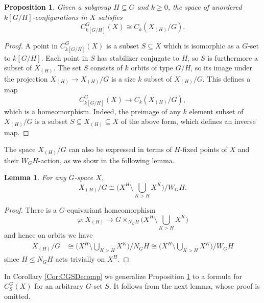 \documentclass[11pt]{amsart}
\newtheorem{lemma}[equation]{Lemma}
\newtheorem{proposition}[equation]{Proposition}
\theoremstyle{definition}
\numberwithin{equation}{subsection} %
\begin{document}
\begin{proposition}\label{Prop:CGOrbits}
Given a subgroup $H\subseteq G$ and $k\geq 0$,
the space of unordered $k[G/H]$-configurations in $X$ satisfies 
$$ C^G_{k[G/H]}(X) \cong C_k \left( X_{(H)}/G \right). $$
\end{proposition}
\begin{proof}
A point in $C^G_{k[G/H]}(X)$ is a subset $S\subseteq X$ which is isomorphic as a $G$-set to $k[G/H]$. Each point in $S$ has stabilizer conjugate to $H$, so $S$ is furthermore a subset of $X_{(H)}$. The set $S$ consists of $k$ orbits of type $G/H$, so its image under the projection $X_{(H)}\to X_{(H)}/G$ is a size $k$ subset of $X_{(H)}/G$. This defines a map $$ C^G_{k[G/H]}(X) \to C_k \left( X_{(H)}/G \right), $$
which is a homeomorphism. Indeed, the preimage of any $k$ element subset of $X_{(H)}/G$ is a subset $S\subseteq X_{(H)}\subseteq X$ of the above form, which defines an inverse map.
\end{proof}

The space $X_{(H)}/G$ can also be expressed in terms of $H$-fixed points of $X$ and their $W_GH$-action, as we show in the following lemma.
\begin{lemma}\label{Lem:modW}
For any $G$-space $X$,
$$ X_{(H)}/G \cong \Big( X^H \setminus \bigcup_{K>H} X^K \Big)/W_GH. $$
\end{lemma}
\begin{proof}
There is a $G$-equivariant homeomorphism
\begin{equation}\label{eq:phi} \varphi: X_{(H)} \to G \times_{N_GH} \Big( X^H \setminus
\bigcup_{K>H} X^K \Big) \end{equation}
and hence on orbits we have
\begin{align*}
X_{(H)}/G & 
\cong \Big( X^H \setminus \bigcup_{K>H} X^K \big)/N_GH
\cong \Big( X^H \setminus \bigcup_{K>H} X^K \big)/W_GH
\end{align*}
since $H\leq N_GH$ acts trivially on $X^H$.
\end{proof}

In Corollary \ref{Cor:CGSDecomp} we generalize Proposition \ref{Prop:CGOrbits} to a formula for $C^G_S(X)$ for an arbitrary $G$-set $S$. It follows from the next lemma, whose proof is omitted.
\end{document}
